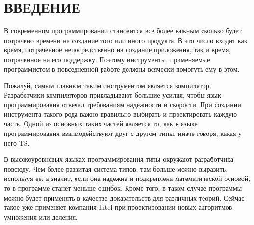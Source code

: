 \chapter*{ВВЕДЕНИЕ}
\label{ch:introduction}


В современном программировании становится все более важным сколько будет потрачено времени на создание того или иного продукта.
В это число входит как время, потраченное непосредственно на создание приложения, так и время, потраченное на его поддержку.
Поэтому инструменты, применяемые программистом в повседневной работе должны всячески помогуть ему в этом.

Пожалуй, самым главным таким инструментом является компилятор.
Разработчики компиляторов прикладывают большие усилия, чтобы язык программирования отвечал требованиям надежности и скорости.
При создании инструмента такого рода важно правильно выбирать и проектировать каждую часть.
Одной из основных таких частей является то, как в языке программирования взаимодействуют друг с другом типы, иначе говоря, какая у него \gls{TS}.

В высокоуровневых языках программирования типы окружают разработчика повсюду.
Чем более развитая система типов, там больше можно выразить, используя ее, а значит, если она надежна и подкреплена математической основой, то в программе станет меньше ошибок.
Кроме того, в таком случае программы можно будет применять в качестве доказательств для различных теорий.
Сейчас такое уже применяет компания Intel при проектировании новых алгоритмов умножения или деления.


